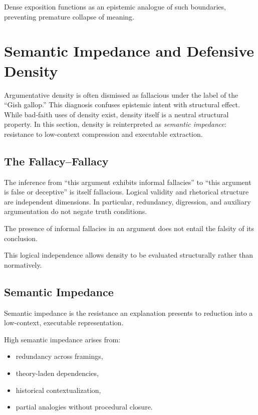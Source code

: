 Dense exposition functions as an epistemic analogue of such boundaries, preventing premature collapse of meaning.

\section{Semantic Impedance and Defensive Density}

Argumentative density is often dismissed as fallacious under the label of the ``Gish gallop.'' This diagnosis confuses epistemic intent with structural effect. While bad-faith uses of density exist, density itself is a neutral structural property. In this section, density is reinterpreted as \emph{semantic impedance}: resistance to low-context compression and executable extraction.

\subsection{The Fallacy--Fallacy}

The inference from ``this argument exhibits informal fallacies'' to ``this argument is false or deceptive'' is itself fallacious. Logical validity and rhetorical structure are independent dimensions. In particular, redundancy, digression, and auxiliary argumentation do not negate truth conditions.

\begin{proposition}
The presence of informal fallacies in an argument does not entail the falsity of its conclusion.
\end{proposition}

This logical independence allows density to be evaluated structurally rather than normatively.

\subsection{Semantic Impedance}

\begin{definition}
Semantic impedance is the resistance an explanation presents to reduction into a low-context, executable representation.
\end{definition}

High semantic impedance arises from:
\begin{itemize}
\item redundancy across framings,
\item theory-laden dependencies,
\item historical contextualization,
\item partial analogies without procedural closure.
\end{itemize}

